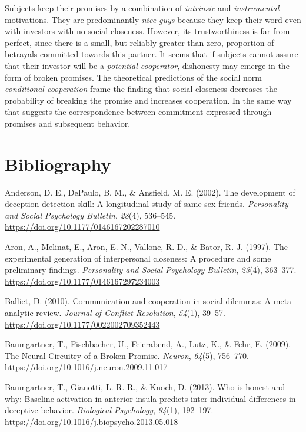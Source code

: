 \documentclass[12pt,]{article}
\begin{document}
Subjects keep their promises by a combination of \emph{intrinsic} and
\emph{instrumental} motivations. They are predominantly \emph{nice guys}
because they keep their word even with investors with no social
closeness. However, its trustworthiness is far from perfect, since there
is a small, but reliably greater than zero, proportion of betrayals
committed towards this partner. It seems that if subjects cannot assure
that their investor will be a \emph{potential cooperator}, dishonesty
may emerge in the form of broken promises. The theoretical predictions
of the social norm \emph{conditional cooperation} frame the finding that
social closeness decreases the probability of breaking the promise and
increases cooperation. In the same way that suggests the correspondence
between commitment expressed through promises and subsequent behavior.

\hypertarget{bibliography}{%
\section*{Bibliography}\label{bibliography}}

\hypertarget{refs}{}
\leavevmode\hypertarget{ref-Anderson2002}{}%
Anderson, D. E., DePaulo, B. M., \& Ansfield, M. E. (2002). The
development of deception detection skill: A longitudinal study of
same-sex friends. \emph{Personality and Social Psychology Bulletin},
\emph{28}(4), 536--545. \url{https://doi.org/10.1177/0146167202287010}

\leavevmode\hypertarget{ref-Aron1997}{}%
Aron, A., Melinat, E., Aron, E. N., Vallone, R. D., \& Bator, R. J.
(1997). The experimental generation of interpersonal closeness: A
procedure and some preliminary findings. \emph{Personality and Social
Psychology Bulletin}, \emph{23}(4), 363--377.
\url{https://doi.org/10.1177/0146167297234003}

\leavevmode\hypertarget{ref-Balliet2010}{}%
Balliet, D. (2010). Communication and cooperation in social dilemmas: A
meta-analytic review. \emph{Journal of Conflict Resolution},
\emph{54}(1), 39--57. \url{https://doi.org/10.1177/0022002709352443}

\leavevmode\hypertarget{ref-Baumgartner2009}{}%
Baumgartner, T., Fischbacher, U., Feierabend, A., Lutz, K., \& Fehr, E.
(2009). The Neural Circuitry of a Broken Promise. \emph{Neuron},
\emph{64}(5), 756--770.
\url{https://doi.org/10.1016/j.neuron.2009.11.017}

\leavevmode\hypertarget{ref-Baumgartner2013}{}%
Baumgartner, T., Gianotti, L. R. R., \& Knoch, D. (2013). Who is honest
and why: Baseline activation in anterior insula predicts
inter-individual differences in deceptive behavior. \emph{Biological
Psychology}, \emph{94}(1), 192--197.
\url{https://doi.org/10.1016/j.biopsycho.2013.05.018}
\end{document}
